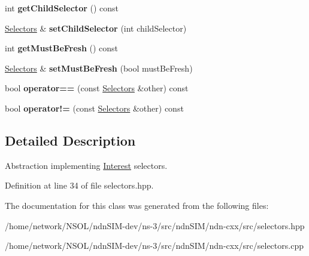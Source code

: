 \begin{DoxyCompactItemize}
\item 
int {\bfseries get\+Child\+Selector} () const\hypertarget{classndn_1_1Selectors_a9838f41307bedc62609d2a12824f0488}{}\label{classndn_1_1Selectors_a9838f41307bedc62609d2a12824f0488}

\item 
\hyperlink{classndn_1_1Selectors}{Selectors} \& {\bfseries set\+Child\+Selector} (int child\+Selector)\hypertarget{classndn_1_1Selectors_a3680bd91f1bcf708835da0b4792a2bc3}{}\label{classndn_1_1Selectors_a3680bd91f1bcf708835da0b4792a2bc3}

\item 
int {\bfseries get\+Must\+Be\+Fresh} () const\hypertarget{classndn_1_1Selectors_a78bb56531b6332f265b7b83226172cd6}{}\label{classndn_1_1Selectors_a78bb56531b6332f265b7b83226172cd6}

\item 
\hyperlink{classndn_1_1Selectors}{Selectors} \& {\bfseries set\+Must\+Be\+Fresh} (bool must\+Be\+Fresh)\hypertarget{classndn_1_1Selectors_ae9463ad04e3b26fca818d3798a66abb3}{}\label{classndn_1_1Selectors_ae9463ad04e3b26fca818d3798a66abb3}

\item 
bool {\bfseries operator==} (const \hyperlink{classndn_1_1Selectors}{Selectors} \&other) const\hypertarget{classndn_1_1Selectors_ac2e2be0d9fb6d875eb6e865310373f64}{}\label{classndn_1_1Selectors_ac2e2be0d9fb6d875eb6e865310373f64}

\item 
bool {\bfseries operator!=} (const \hyperlink{classndn_1_1Selectors}{Selectors} \&other) const\hypertarget{classndn_1_1Selectors_ac89631718d50231cb1d20683145746d9}{}\label{classndn_1_1Selectors_ac89631718d50231cb1d20683145746d9}

\end{DoxyCompactItemize}


\subsection{Detailed Description}
Abstraction implementing \hyperlink{classndn_1_1Interest}{Interest} selectors. 

Definition at line 34 of file selectors.\+hpp.



The documentation for this class was generated from the following files\+:\begin{DoxyCompactItemize}
\item 
/home/network/\+N\+S\+O\+L/ndn\+S\+I\+M-\/dev/ns-\/3/src/ndn\+S\+I\+M/ndn-\/cxx/src/selectors.\+hpp\item 
/home/network/\+N\+S\+O\+L/ndn\+S\+I\+M-\/dev/ns-\/3/src/ndn\+S\+I\+M/ndn-\/cxx/src/selectors.\+cpp\end{DoxyCompactItemize}

